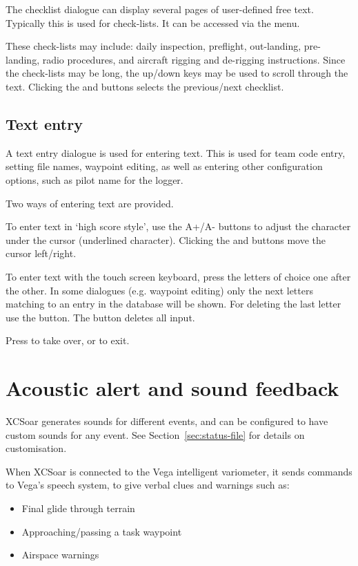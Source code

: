 The checklist dialogue can display several pages of user-defined free text.
Typically this is used for check-lists. It can be accessed via the menu.

\blink{}

These check-lists may include: daily inspection, preflight,
out-landing, pre-landing, radio procedures, and aircraft rigging and
de-rigging instructions.  Since the check-lists may be long, the
up/down keys may be used to scroll through the text. Clicking the
\bmenuw{$<$} and \bmenuw{$>$} buttons selects the previous/next
checklist.


\subsection*{Text entry} \label{sec:textentry}

A text entry dialogue is used for entering text.  This is used for team
code entry, setting file names, waypoint editing, as well as entering
other configuration options, such as pilot name for the logger.

Two ways of entering text are provided. 

To enter text in `high score style', use the A+/A- buttons to adjust the 
character under the cursor (underlined character). Clicking the \button{$<$} 
and \button{$>$} buttons move the cursor left/right.  

To enter text with the touch screen keyboard, press the letters of choice 
one after the other. In some dialogues (e.g. waypoint editing) only the next 
letters matching to an entry in the database will be shown. For deleting the 
last letter use the \button{$<-$} button. The  button deletes all input.

Press  to take over, or  to exit.


\section{Acoustic alert and sound feedback}

XCSoar generates sounds for different events, and can be configured to
have custom sounds for any event.  See Section~\ref{sec:status-file} for
details on customisation.

When XCSoar is connected to the Vega intelligent variometer, it sends
commands to Vega's speech system, to give verbal clues and warnings such as:
\begin{itemize}
\item Final glide through terrain
\item Approaching/passing a task waypoint
\item Airspace warnings
\end{itemize}


